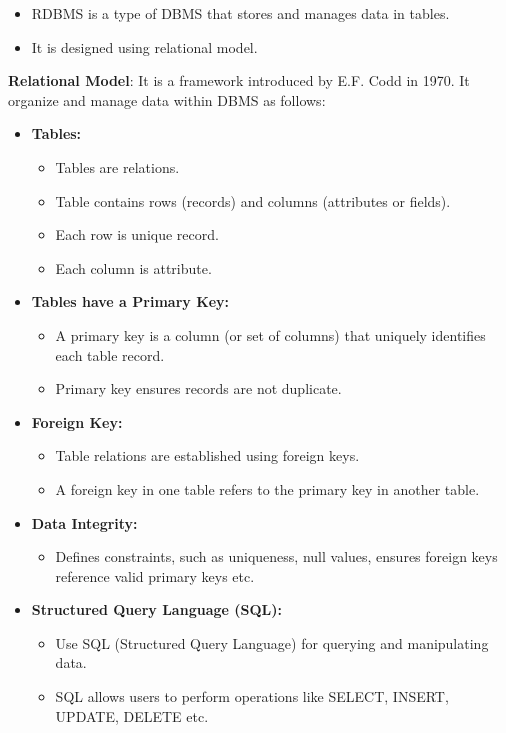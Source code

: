 \begin{flushleft}
	
	\begin{itemize}
		\item RDBMS is a type of DBMS that stores and manages data in tables. 
		\item It is designed using relational model.
	\end{itemize}

	\textbf{Relational Model}: It is a framework introduced by E.F. Codd in 1970. It organize and manage data within DBMS as follows:
	\begin{itemize}
		\item \textbf{Tables:} 
		\begin{itemize}
			\item Tables are relations.
			\item Table contains rows (records) and columns (attributes or fields).
			\item Each row is unique record.
			\item Each column is attribute.
		\end{itemize}
		
		\item \textbf{Tables have a Primary Key:}
		\begin{itemize}
			\item A primary key is a column (or set of columns) that uniquely identifies each table record. 
			\item Primary key ensures records are not duplicate.
		\end{itemize}
	
		\item \textbf{Foreign Key:}
		\begin{itemize}
			\item Table relations are established using foreign keys. 
			\item A foreign key in one table refers to the primary key in another table.
		\end{itemize}
	
		\item \textbf{Data Integrity:}
		\begin{itemize}
			\item Defines constraints, such as uniqueness, null values, ensures foreign keys reference valid primary keys etc.
		\end{itemize}
	
		\item \textbf{Structured Query Language (SQL):}
		\begin{itemize}
			\item Use SQL (Structured Query Language) for querying and manipulating data. 
			\item SQL allows users to perform operations like SELECT, INSERT, UPDATE, DELETE etc.
		\end{itemize}
	

\end{itemize}
\end{flushleft}
